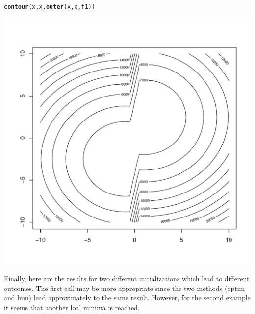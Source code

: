 \documentclass[11pt]{article}\usepackage[]{graphicx}\usepackage[]{color}
\makeatletter
\def\maxwidth{ %
  \ifdim\Gin@nat@width>\linewidth
    \linewidth
  \else
    \Gin@nat@width
  \fi
}
\newcommand{\hlstd}[1]{\textcolor[rgb]{0.345,0.345,0.345}{#1}}%
\newcommand{\hlkwd}[1]{\textcolor[rgb]{0.737,0.353,0.396}{\textbf{#1}}}%
\newenvironment{kframe}{%
 \def\at@end@of@kframe{}%
 \ifinner\ifhmode%
  \def\at@end@of@kframe{\end{minipage}}%
  \begin{minipage}{\columnwidth}%
 \fi\fi%
 \def\FrameCommand##1{\hskip\@totalleftmargin \hskip-\fboxsep
 \colorbox{shadecolor}{##1}\hskip-\fboxsep
     \hskip-\linewidth \hskip-\@totalleftmargin \hskip\columnwidth}%
 \MakeFramed {\advance\hsize-\width
   \@totalleftmargin\z@ \linewidth\hsize
   \@setminipage}}%
 {\par\unskip\endMakeFramed%
 \at@end@of@kframe}
\newenvironment{knitrout}{}{} %
\makeatother
\begin{document}
\begin{knitrout}
\color{fgcolor}\begin{kframe}
\begin{alltt}
\hlkwd{contour}\hlstd{(x,x,}\hlkwd{outer}\hlstd{(x,x,f1))}
\end{alltt}
\end{kframe}
\includegraphics[width=\maxwidth]{figure/unnamed-chunk-19-1} 

\end{knitrout}
Finally, here are the results for two different initializations which lead to different outcomes. The first call may be more appropriate since the two methods (optim and lnm) lead approximately to the same result. However, for the second example it seems that another loal minima is reached.
\end{document}
